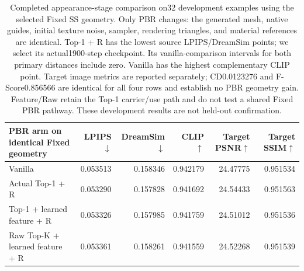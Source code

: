 \begin{table}[t]
\centering\small
\setlength{\tabcolsep}{4pt}
\begin{tabular}{lrrrrr}
\toprule
PBR arm on identical Fixed geometry&LPIPS$\downarrow$&DreamSim$\downarrow$&CLIP$\uparrow$&Target PSNR$\uparrow$&Target SSIM$\uparrow$\\
\midrule
Vanilla&0.053513&0.158346&0.942179&24.47775&0.951534\\
Actual Top-1 + R&0.053290&0.157828&0.941692&24.54433&0.951563\\
Top-1 + learned feature + R&0.053326&0.157985&0.941759&24.51012&0.951536\\
Raw Top-K + learned feature + R&0.053361&0.158261&0.941559&24.52268&0.951539\\
\bottomrule
\end{tabular}
\caption{Completed appearance-stage comparison on32 development examples
using the selected Fixed SS geometry. Only PBR changes: the generated mesh,
native guides, initial texture noise, sampler, rendering triangles, and material
references are identical. Top-1 + R has the lowest source LPIPS/DreamSim points;
we select its actual1900-step checkpoint. Its vanilla-comparison intervals for
both primary distances include zero. Vanilla has the highest complementary
CLIP point. Target image metrics are reported separately; CD0.0123276 and
F-Score0.856566 are identical for all four rows and establish no PBR geometry
gain. Feature/Raw retain the Top-1 carrier/use path and do not test a shared
Fixed PBR pathway. These development results are not held-out confirmation.}
\label{tab:selected-pbr-appearance32}
\end{table}
